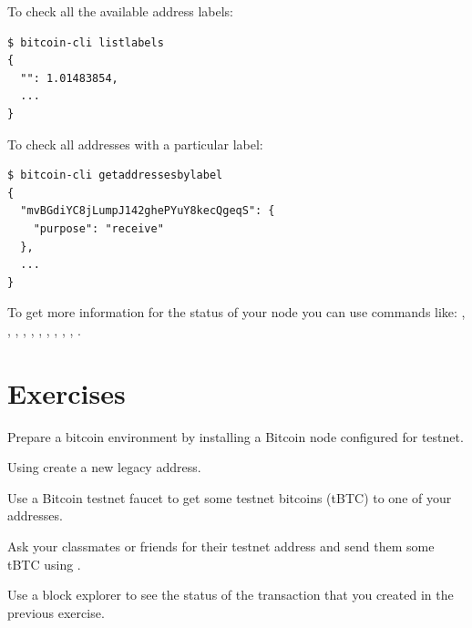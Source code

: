 \noindent To check all the available address labels:
\begin{emphbox}
\begin{lstlisting}[style=Bash]
$ bitcoin-cli listlabels
{
  "": 1.01483854,
  ...
}
\end{lstlisting}
\end{emphbox}
\vspace{1em}

\noindent To check all addresses with a particular label:
\begin{emphbox}
\begin{lstlisting}[style=Bash]
$ bitcoin-cli getaddressesbylabel
{ 
  "mvBGdiYC8jLumpJ142ghePYuY8kecQgeqS": {
    "purpose": "receive"
  },
  ...
}
\end{lstlisting}
\end{emphbox}
\vspace{1em}

To get more information for the status of your node you can use commands like: , , , , , , , , , , .

\section{Exercises}

\begin{exercise}
Prepare a bitcoin environment by installing a Bitcoin node configured for testnet. 
\end{exercise}

\begin{exercise}
Using  create a new legacy address.
\end{exercise}

\begin{exercise}
Use a Bitcoin testnet faucet to get some testnet bitcoins (tBTC) to one of your addresses.
\end{exercise}

\begin{exercise}
Ask your classmates or friends for their testnet address and send them some tBTC using .
\end{exercise}

\begin{exercise}
Use a block explorer to see the status of the transaction that you created in the previous exercise.
\end{exercise}


